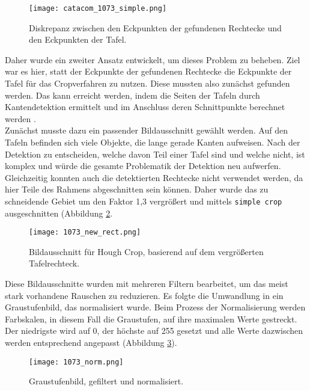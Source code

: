 \begin{figure}[h!]
\centering
\texttt{[image: catacom\_1073\_simple.png]}
\caption{Diskrepanz zwischen den Eckpunkten der gefundenen Rechtecke und den Eckpunkten der Tafel.}
\label{fig:parallelogramm}
\end{figure}

Daher wurde ein zweiter Ansatz entwickelt, um dieses Problem zu beheben. Ziel war es hier, statt der Eckpunkte der gefundenen Rechtecke die Eckpunkte der Tafel für das Cropverfahren zu nutzen. Diese mussten also zunächst gefunden werden. Das kann erreicht werden, indem die Seiten der Tafeln durch Kantendetektion ermittelt und im Anschluss deren Schnittpunkte berechnet werden \cite{qixiangye}{} \cite{shaw}.\\
Zunächst musste dazu ein passender Bildausschnitt gewählt werden. Auf den Tafeln befinden sich viele Objekte, die lange gerade Kanten aufweisen. Nach der Detektion zu entscheiden, welche davon Teil einer Tafel sind und welche nicht, ist komplex und würde die gesamte Problematik der Detektion neu aufwerfen. Gleichzeitig konnten auch die detektierten Rechtecke nicht verwendet werden, da hier Teile des Rahmens abgeschnitten sein können. Daher wurde das zu schneidende Gebiet um den Faktor 1,3 vergrößert und mittels \verb|simple crop| ausgeschnitten (Abbildung \ref{fig:tafelrechteck}.

\begin{figure}[h!]
\centering
\texttt{[image: 1073\_new\_rect.png]}
\caption{Bildausschnitt für Hough Crop, basierend auf dem vergrößerten Tafelrechteck.}
\label{fig:tafelrechteck}
\end{figure}

Diese Bildausschnitte wurden mit mehreren Filtern bearbeitet, um das meist stark vorhandene Rauschen zu reduzieren. Es folgte die Umwandlung in ein Graustufenbild, das normalisiert wurde. Beim Prozess der Normalisierung werden Farbskalen, in diesem Fall die Graustufen, auf ihre maximalen Werte gestreckt. Der niedrigste wird auf 0, der höchste auf 255 gesetzt und alle Werte dazwischen werden entsprechend angepasst (Abbildung \ref{fig:norm}).

\begin{figure}[h!]
\centering
\texttt{[image: 1073\_norm.png]}
\caption{Graustufenbild, gefiltert und normalisiert.}
\label{fig:norm}
\end{figure}

